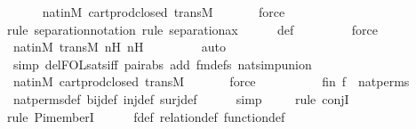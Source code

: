 \begin{isabellebody}
\ \ \ \ \isamarkupfalse%
\ nat{\isacharunderscore}{\kern0pt}in{\isacharunderscore}{\kern0pt}M\ cartprod{\isacharunderscore}{\kern0pt}closed\ transM\isanewline
\ \ \ \ \ \isamarkupfalse%
\ force\isanewline
\ \ \ \ \isamarkupfalse%
{\isacharparenleft}{\kern0pt}rule\ separation{\isacharunderscore}{\kern0pt}notation{\isacharcomma}{\kern0pt}\ rule\ separation{\isacharunderscore}{\kern0pt}ax{\isacharparenright}{\kern0pt}\isanewline
\ \ \ \ \isamarkupfalse%
\ {\isasympsi}{\isacharunderscore}{\kern0pt}def\isanewline
\ \ \ \ \ \ \ \isamarkupfalse%
\ force\isanewline
\ \ \ \ \isamarkupfalse%
\ nat{\isacharunderscore}{\kern0pt}in{\isacharunderscore}{\kern0pt}M\ transM\ nH\ n{\isacharprime}{\kern0pt}H\ \isanewline
\ \ \ \ \ \ \isamarkupfalse%
\ auto{\isacharbrackleft}{\kern0pt}{}{\isacharbrackright}{\kern0pt}\isanewline
\ \ \ \ \ \isamarkupfalse%
\ {\isacharparenleft}{\kern0pt}simp\ del{\isacharcolon}{\kern0pt}FOL{\isacharunderscore}{\kern0pt}sats{\isacharunderscore}{\kern0pt}iff\ pair{\isacharunderscore}{\kern0pt}abs\ add{\isacharcolon}{\kern0pt}\ fm{\isacharunderscore}{\kern0pt}defs\ nat{\isacharunderscore}{\kern0pt}simp{\isacharunderscore}{\kern0pt}union{\isacharparenright}{\kern0pt}\isanewline
\ \ \ \ \isamarkupfalse%
\ nat{\isacharunderscore}{\kern0pt}in{\isacharunderscore}{\kern0pt}M\ cartprod{\isacharunderscore}{\kern0pt}closed\ transM\isanewline
\ \ \ \ \ \isamarkupfalse%
\ force\isanewline
\ \ \ \ \isamarkupfalse%
\isanewline
\ \ \isamarkupfalse%
\ \isamarkupfalse%
\ fin{\isacharcolon}{\kern0pt}\ {\isachardoublequoteopen}f\ {\isasymin}\ nat{\isacharunderscore}{\kern0pt}perms{\isachardoublequoteclose}\ \isanewline
\ \ \ \ \isamarkupfalse%
\ nat{\isacharunderscore}{\kern0pt}perms{\isacharunderscore}{\kern0pt}def\ bij{\isacharunderscore}{\kern0pt}def\ inj{\isacharunderscore}{\kern0pt}def\ surj{\isacharunderscore}{\kern0pt}def\isanewline
\ \ \ \ \isamarkupfalse%
\ simp\isanewline
\ \ \ \ \isamarkupfalse%
{\isacharparenleft}{\kern0pt}rule\ conjI{\isacharparenright}{\kern0pt}\isanewline
\ \ \ \ \ \isamarkupfalse%
{\isacharparenleft}{\kern0pt}rule\ Pi{\isacharunderscore}{\kern0pt}memberI{\isacharparenright}{\kern0pt}\isanewline
\ \ \ \ \isamarkupfalse%
\ f{\isacharunderscore}{\kern0pt}def\ relation{\isacharunderscore}{\kern0pt}def\ function{\isacharunderscore}{\kern0pt}def\isanewline

\end{isabellebody}
